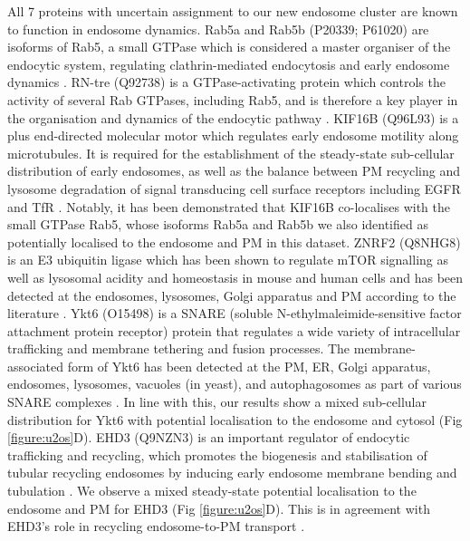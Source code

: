 \documentclass[12pt,english]{article}
\begin{document}
All 7 proteins with uncertain assignment to our new endosome cluster are known to function in endosome dynamics. Rab5a and Rab5b (P20339; P61020) are isoforms of Rab5, a small GTPase which is considered a master organiser of the endocytic system, regulating clathrin-mediated endocytosis and early endosome dynamics \citep{Simonsen::1998,Woodman::2000, Zerial::2001, Rink::2005, Mendoza::2013, Chen::2014, Gautreau::2014, Law::2017}. RN-tre (Q92738) is a GTPase-activating protein which controls the activity of several Rab GTPases, including Rab5, and is therefore a key player in the organisation and dynamics of the endocytic pathway \citep{Lanzetti::2000, Gautreau::2014}. KIF16B (Q96L93) is a plus end-directed molecular motor which regulates early endosome motility along microtubules. It is required for the establishment of the steady-state sub-cellular distribution of early endosomes, as well as the balance between PM recycling and lysosome degradation of signal transducing cell surface receptors including EGFR and TfR \citep{Hoepfner:2005, Carlucci::2010}. Notably, it has been demonstrated that KIF16B co-localises with the small GTPase Rab5, whose isoforms Rab5a and Rab5b we also identified as potentially localised to the endosome and PM in this dataset. ZNRF2 (Q8NHG8) is an E3 ubiquitin ligase which has been shown to regulate mTOR signalling as well as lysosomal acidity and homeostasis in mouse and human cells and has been detected at the endosomes, lysosomes, Golgi apparatus and PM according to the literature \citep{Araki:2003, Hoxhaj:2016}. Ykt6 (O15498) is a SNARE (soluble N-ethylmaleimide-sensitive factor attachment protein receptor) protein that regulates a wide variety of intracellular trafficking and membrane tethering and fusion processes. The membrane-associated form of Ykt6 has been detected at the PM, ER, Golgi apparatus, endosomes, lysosomes, vacuoles (in yeast), and autophagosomes as part of various SNARE complexes \citep{Dilcher::2001, Tai:2004,Fukasawa::2004,Meiringer::2008, Takats::2018, Matsui::2018, Linnemannstons::2018, Yong::2019}. In line with this, our results show a mixed sub-cellular distribution for Ykt6 with potential localisation to the endosome and cytosol (Fig \ref{figure:u2os}D). EHD3 (Q9NZN3) is an important regulator of endocytic trafficking and recycling, which promotes the biogenesis and stabilisation of tubular recycling endosomes by inducing early endosome membrane bending and tubulation \citep{Bahl::2016,Henmi::2016}. We observe a mixed steady-state potential localisation to the endosome and PM for EHD3 (Fig \ref{figure:u2os}D). This is in agreement with EHD3's role in recycling endosome-to-PM transport \citep{Naslavsky::2006,Naslavsky::2009,George::2007,Cabasso::2015, Henmi::2016}.
\end{document}
